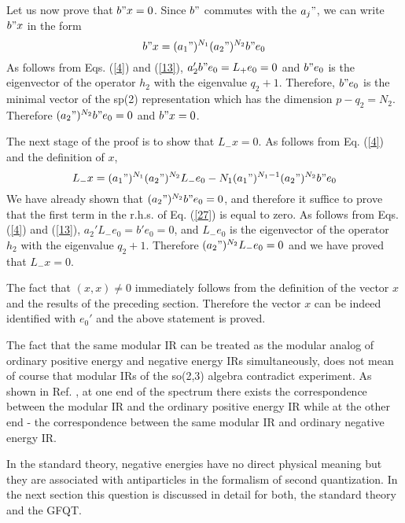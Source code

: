 \documentclass[a4paper,12pt]{article}%
\begin{document}
Let us now prove that $b"x=0$. Since $b"$ commutes with the
$a_j"$, we can write $b"x$ in the form
\begin{equation}
b"x = (a_1")^{N_1}(a_2")^{N_2}b"e_0
\label{26}
\end{equation}
As follows from Eqs. (\ref{4}) and (\ref{13}), 
$a_2'b"e_0=L_+e_0=0$ and $b"e_0$ is the eigenvector
of the operator $h_2$ with the eigenvalue $q_2+1$.
Therefore, $b"e_0$ is the minimal vector of the sp(2)
representation which has the dimension $p-q_2=N_2$.
Therefore $(a_2")^{N_2}b"e_0=0$ and $b"x=0$.

The next stage of the proof is to show that $L_-x=0$.
As follows from Eq. (\ref{4}) and the definition of
$x$,
\begin{equation}
L_-x = (a_1")^{N_1}(a_2")^{N_2}L_-e_0-
N_1(a_1")^{N_1-1}(a_2")^{N_2}b"e_0
\label{27}
\end{equation}
We have already shown that $(a_2")^{N_2}b"e_0=0$,
and therefore it suffice to prove that the first term
in the r.h.s. of Eq. (\ref{27}) is equal to zero. As follows
from Eqs. (\ref{4}) and (\ref{13}), $a_2'L_-e_0=b'e_0=0$,
and $L_-e_0$ is the eigenvector of the operator $h_2$ with the
eigenvalue $q_2+1$. Therefore $(a_2")^{N_2}L_-e_0=0$ and we
have proved that $L_-x=0$.

The fact that $(x,x)\neq 0$ immediately follows from the
definition of the vector $x$ and the results of the preceding
section. Therefore the vector $x$ can be indeed identified with
$e_0'$ and the above statement is proved.
 
The fact that the same modular IR can be treated
as the modular analog of ordinary positive energy and negative 
energy IRs simultaneously, does not mean of course that
modular IRs of the so(2,3) algebra contradict experiment.
As shown in Ref. \cite{lev2}, at one end of the spectrum there 
exists the correspondence
between the modular IR and the ordinary positive energy IR
while at the other end - the correspondence between the same 
modular IR and ordinary negative energy IR.

In the standard theory, negative energies have no direct
physical meaning but they are associated with antiparticles
in the formalism of second quantization. In the next
section this question is discussed in detail for both, the 
standard theory and the GFQT.
\end{document}
